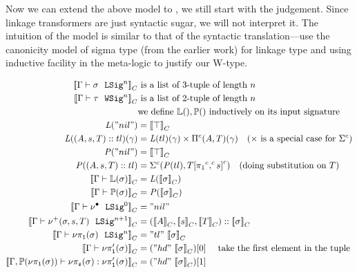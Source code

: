 Now we can extend the above model to \TT , we still start with the judgement. Since linkage transformers are just syntactic sugar, we will not interpret it.
The intuition of the model is similar to that of the syntactic translation---use the canonicity model of sigma type (from the earlier work) for linkage type and using inductive facility in the meta-logic to justify our W-type. 

\begin{align*}
  \denotesC{\goodSig{\Gm}{\lsig}{n}} & \text{ is a list of 3-tuple of length $n$  } \\
  \denotesC{\goodWSig{\Gm}{\wsig}{n}} &\text{ is a list of 2-tuple of length $n$ } \\
  & \text{we define }\TyLkg{}, \TyTkg{} \text{ inductively on its input signature} \\ 
  \mathit{L}("nil") &= \denotesC{\top} \\
  \mathit{L}((A,s,T) :: tl)(\gm) &= {\mathit{L}(tl)}(\gm) \times \GluedPi{A}{T}(\gm) \quad \text{($\times$ is a special case for $\Glued{\Sigma}$)}  \\
  \mathit{P}("nil") &= \denotesC{\top}\\
  \mathit{P}((A,s,T) :: tl) &= \Glued{\Sigma}(\mathit{P}(tl), \Gsub{T}{\GSubstExt{\Glued{\pi_1}}{s}}) \quad \text{(doing substitution on $T$)} \\
  \denotesC{\goodType{\Gm}{\TyLkg{\lsig}}{}} &= \mathit{L}(\denotesC{\lsig}) \\
  \denotesC{\goodType{\Gm}{\TyTkg{\lsig}}{}} &= \mathit{P}(\denotesC{\lsig}) \\
  \denotesC{\goodSig{\Gm}{\LSigEmp}{0}} &= "nil"\\ 
  \denotesC{\goodSig{\Gm}{\LSigAdd{\lsig}{s}{T}}{n+1}} &= (\denotesC{A}, \denotesC{s}, \denotesC{T})::\denotesC{\lsig}\\ 
  \denotesC{\goodSig{\Gm}{\lsigproj{1}{\lsig}}{n}} &= "tl"~\denotesC{\lsig}\\ 
  \denotesC{\goodType{\Gm}{\lsigprojT{\lsig}}{}} &= ("hd"~\denotesC{\lsig})[0] \quad \text{ take the first element in the tuple}\\ 
  \denotesC{\goodTerm{\Gm, \TyTkg{\lsigproj{1}{\lsig}}}{\lsigproj{s}{\lsig}}{\lsigprojT{\lsig}}} &= ("hd"~\denotesC{\lsig})[1]\\ 

\end{align*}
